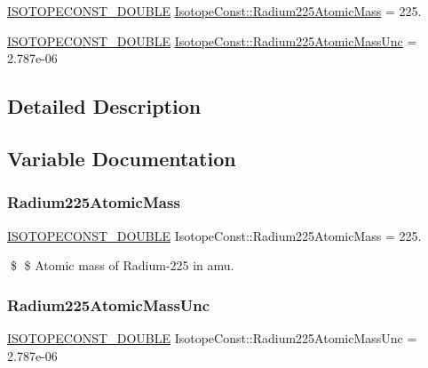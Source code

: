 \begin{DoxyCompactItemize}
\item 
\mbox{\hyperlink{group___isotope_const-_macros_ga8f45a7272ce02c0b4c65c44636ed719a}{I\+S\+O\+T\+O\+P\+E\+C\+O\+N\+S\+T\+\_\+\+D\+O\+U\+B\+LE}} \mbox{\hyperlink{group___isotope_const-_radium-_ra225_ga4a166ef286c71861391ae7bb216a42db}{Isotope\+Const\+::\+Radium225\+Atomic\+Mass}} = 225.
\item 
\mbox{\hyperlink{group___isotope_const-_macros_ga8f45a7272ce02c0b4c65c44636ed719a}{I\+S\+O\+T\+O\+P\+E\+C\+O\+N\+S\+T\+\_\+\+D\+O\+U\+B\+LE}} \mbox{\hyperlink{group___isotope_const-_radium-_ra225_ga74d0b1bc5a9f34915ceeacc8e7544286}{Isotope\+Const\+::\+Radium225\+Atomic\+Mass\+Unc}} = 2.\+787e-\/06
\end{DoxyCompactItemize}


\subsection{Detailed Description}


\subsection{Variable Documentation}
\mbox{\label{group___isotope_const-_radium-_ra225_ga4a166ef286c71861391ae7bb216a42db}} 
\subsubsection{\texorpdfstring{Radium225\+Atomic\+Mass}{Radium225AtomicMass}}
{\footnotesize\ttfamily \mbox{\hyperlink{group___isotope_const-_macros_ga8f45a7272ce02c0b4c65c44636ed719a}{I\+S\+O\+T\+O\+P\+E\+C\+O\+N\+S\+T\+\_\+\+D\+O\+U\+B\+LE}} Isotope\+Const\+::\+Radium225\+Atomic\+Mass = 225.}

\$ \$ Atomic mass of Radium-\/225 in amu. \mbox{\label{group___isotope_const-_radium-_ra225_ga74d0b1bc5a9f34915ceeacc8e7544286}} 
\subsubsection{\texorpdfstring{Radium225\+Atomic\+Mass\+Unc}{Radium225AtomicMassUnc}}
{\footnotesize\ttfamily \mbox{\hyperlink{group___isotope_const-_macros_ga8f45a7272ce02c0b4c65c44636ed719a}{I\+S\+O\+T\+O\+P\+E\+C\+O\+N\+S\+T\+\_\+\+D\+O\+U\+B\+LE}} Isotope\+Const\+::\+Radium225\+Atomic\+Mass\+Unc = 2.\+787e-\/06}


